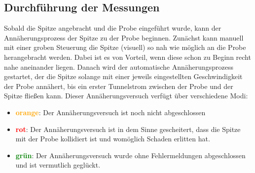 \subsection{Durchführung der Messungen}
Sobald die Spitze angebracht und die Probe eingeführt wurde, 
kann der Annäherungsprozess der Spitze zu der Probe beginnen. 
Zunächst kann manuell mit einer groben Steuerung die Spitze
(visuell) so nah wie möglich an die Probe herangebracht werden.
Dabei ist es von Vorteil, wenn diese schon zu Beginn recht nahe
aneinander liegen. Danach wird der automatische Annäherungsprozess
gestartet, der die Spitze solange mit einer jeweils eingestellten
Geschwindigkeit der Probe annähert, bis ein erster Tunnelstrom
zwischen der Probe und der Spitze fließen kann.  
Dieser Annäherungsversuch verfügt über verschiedene Modi:
\begin{itemize}
    \item \textbf{\textcolor{orange}{orange}}:
            Der Annäherungsversuch ist noch
            nicht abgeschlossen
    \item \textbf{\textcolor{red}{rot}}: 
            Der Annäherungsversuch ist in dem Sinne
            gescheitert, dass die Spitze mit der Probe kollidiert
            ist und womöglich Schaden erlitten hat. 
    \item \textbf{\textcolor{green}{grün}}: 
            Der Annäherungsversuch
            wurde ohne Fehlermeldungen
            abgeschlossen und ist vermutlich geglückt.
\end{itemize}
